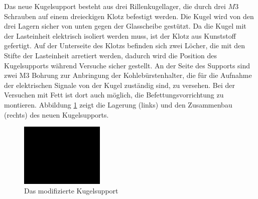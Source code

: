 Das neue Kugelsupport besteht aus drei Rillenkugellager, die durch drei $M3$ Schrauben auf einem dreieckigen Klotz befestigt werden.
Die Kugel wird von den drei Lagern sicher von unten gegen der Glasscheibe gestützt.
Da die Kugel mit der Lasteinheit elektrisch isoliert werden muss, ist der Klotz aus Kunststoff gefertigt.
Auf der Unterseite des Klotzs befinden sich zwei Löcher, die mit den Stifte der Lasteinheit arretiert werden, dadurch wird die Position des Kugelsupports während Versuche sicher gestellt.
An der Seite des Supports sind zwei M3 Bohrung zur Anbringung der Kohlebürstenhalter, die für die Aufnahme der elektrischen Signale von der Kugel zuständig sind, zu versehen.
Bei der Versuchen mit Fett ist dort auch möglich, die Befettungsvorrichtung zu montieren.
Abbildung \ref{fig:das_modifizierte_kugelsupport} zeigt die Lagerung (links) und den Zusammenbau (rechts) des neuen Kugelsupports.
\begin{figure}[htb]
    \centering
    \includegraphics[width=4cm]{./images/blank_img.jpg}
    \caption{Das modifizierte Kugelsupport}
    \label{fig:das_modifizierte_kugelsupport}
\end{figure}
%

